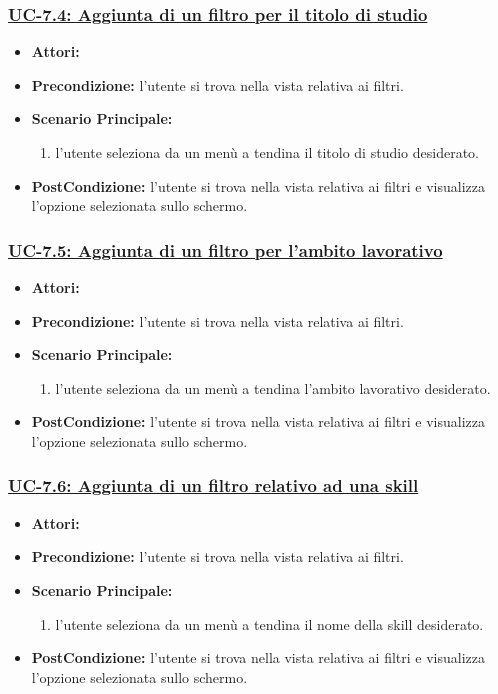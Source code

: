 \subsubsection{\underline{UC-7.4: Aggiunta di un filtro per il titolo di studio}}
\begin{itemize}
	\item \textbf{Attori:}\loggedusr
	\item \textbf{Precondizione:} l'utente si trova nella vista relativa ai filtri.
	\item \textbf{Scenario Principale:}
	\begin{enumerate}
		\item l'utente seleziona da un menù a tendina il titolo di studio desiderato.
	\end{enumerate}
	\item \textbf{PostCondizione:}  l'utente si trova nella vista relativa ai filtri e visualizza l'opzione selezionata sullo schermo.
\end{itemize}
\subsubsection{\underline{UC-7.5: Aggiunta di un filtro per l'ambito lavorativo}}
\begin{itemize}
	\item \textbf{Attori:}\loggedusr
	\item \textbf{Precondizione:} l'utente si trova nella vista relativa ai filtri.
	\item \textbf{Scenario Principale:}
	\begin{enumerate}
		\item l'utente seleziona da un menù a tendina l'ambito lavorativo desiderato.
	\end{enumerate}
	\item \textbf{PostCondizione:}  l'utente si trova nella vista relativa ai filtri e visualizza l'opzione selezionata sullo schermo.
\end{itemize}

\subsubsection{\underline{UC-7.6: Aggiunta di un filtro relativo ad una skill }}
\begin{itemize}
	\item \textbf{Attori:}\loggedusr
	\item \textbf{Precondizione:} l'utente si trova nella vista relativa ai filtri.
	\item \textbf{Scenario Principale:}
	\begin{enumerate}
		\item l'utente seleziona da un menù a tendina il nome della skill desiderato.
	\end{enumerate}
	\item \textbf{PostCondizione:}  l'utente si trova nella vista relativa ai filtri e visualizza l'opzione selezionata sullo schermo.
\end{itemize}

